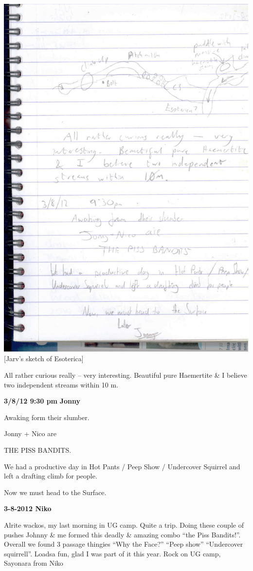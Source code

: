 \includegraphics{UgLog1012/83.jpeg}\\
{[}Jarv's sketch of Esoterica{]}

All rather curious really -- very interesting. Beautiful pure Haemertite
\& I believe two independent streams within 10 m.

\textbf{3/8/12 9:30 pm} \textbf{Jonny}

Awaking form their slumber.

Jonny + Nico are

THE PISS BANDITS.

We had a productive day in Hot Pants / Peep Show / Undercover Squirrel
and left a drafting climb for people.

Now we must head to the Surface.

\textbf{3-8-2012 Niko}

Alrite wackos, my last morning in UG camp. Quite a trip. Doing these
couple of pushes Johnny \& me formed this deadly \& amazing combo ``the
Piss Bandits!''. Overall we found 3 passage thingies ``Why the Face?''
``Peep show'' ``Undercover squirrell''. Loadsa fun, glad I was part of
it this year. Rock on UG camp, Sayonara from Niko

